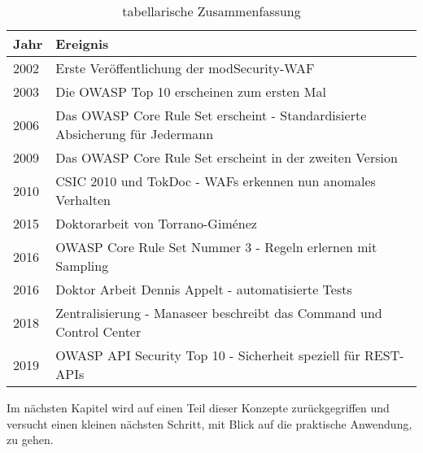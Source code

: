 \begin{table}[H]
    \centering
 
\begin{tabular}{lp{9cm}}
  \toprule
  Jahr & Ereignis\\
  \midrule
  2002 & Erste Veröffentlichung der modSecurity-WAF \\
  2003 & Die OWASP Top 10 erscheinen zum ersten Mal\\
  2006 & Das OWASP Core Rule Set erscheint - Standardisierte Absicherung für Jedermann \\
  2009 & Das OWASP Core Rule Set erscheint in der zweiten Version \\
  2010 & CSIC 2010 und TokDoc - WAFs erkennen nun anomales Verhalten \\
  2015 & Doktorarbeit von Torrano-Giménez \\
  2016 & OWASP Core Rule Set Nummer 3 - Regeln erlernen mit Sampling \\
  2016 & Doktor Arbeit Dennis Appelt - automatisierte Tests \\
  2018 & Zentralisierung - Manaseer beschreibt das Command und Control Center\\
  2019 & OWASP API Security Top 10 - Sicherheit speziell für REST-APIs\\
  \bottomrule
\end{tabular}
\caption{tabellarische Zusammenfassung}
\label{tab:zeitstrahl}
\end{table}

Im nächsten Kapitel wird auf einen Teil dieser Konzepte zurückgegriffen und versucht einen kleinen nächsten Schritt, mit Blick auf die praktische Anwendung, zu gehen.

